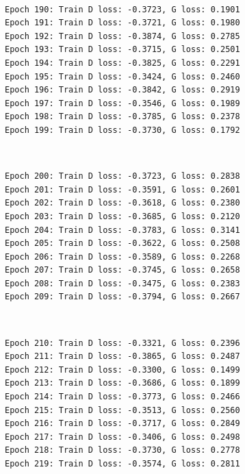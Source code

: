 \documentclass[11pt]{article}
\begin{document}
    \begin{center}
    \end{center}
    { \hspace*{\fill} \\}
    
    \begin{Verbatim}[commandchars=\\\{\}]
Epoch 190: Train D loss: -0.3723, G loss: 0.1901
Epoch 191: Train D loss: -0.3721, G loss: 0.1980
Epoch 192: Train D loss: -0.3874, G loss: 0.2785
Epoch 193: Train D loss: -0.3715, G loss: 0.2501
Epoch 194: Train D loss: -0.3825, G loss: 0.2291
Epoch 195: Train D loss: -0.3424, G loss: 0.2460
Epoch 196: Train D loss: -0.3842, G loss: 0.2919
Epoch 197: Train D loss: -0.3546, G loss: 0.1989
Epoch 198: Train D loss: -0.3785, G loss: 0.2378
Epoch 199: Train D loss: -0.3730, G loss: 0.1792

    \end{Verbatim}

    \begin{center}
    \end{center}
    { \hspace*{\fill} \\}
    
    \begin{Verbatim}[commandchars=\\\{\}]
Epoch 200: Train D loss: -0.3723, G loss: 0.2838
Epoch 201: Train D loss: -0.3591, G loss: 0.2601
Epoch 202: Train D loss: -0.3618, G loss: 0.2380
Epoch 203: Train D loss: -0.3685, G loss: 0.2120
Epoch 204: Train D loss: -0.3783, G loss: 0.3141
Epoch 205: Train D loss: -0.3622, G loss: 0.2508
Epoch 206: Train D loss: -0.3589, G loss: 0.2268
Epoch 207: Train D loss: -0.3745, G loss: 0.2658
Epoch 208: Train D loss: -0.3475, G loss: 0.2383
Epoch 209: Train D loss: -0.3794, G loss: 0.2667

    \end{Verbatim}

    \begin{center}
    \end{center}
    { \hspace*{\fill} \\}
    
    \begin{Verbatim}[commandchars=\\\{\}]
Epoch 210: Train D loss: -0.3321, G loss: 0.2396
Epoch 211: Train D loss: -0.3865, G loss: 0.2487
Epoch 212: Train D loss: -0.3300, G loss: 0.1499
Epoch 213: Train D loss: -0.3686, G loss: 0.1899
Epoch 214: Train D loss: -0.3773, G loss: 0.2466
Epoch 215: Train D loss: -0.3513, G loss: 0.2560
Epoch 216: Train D loss: -0.3717, G loss: 0.2849
Epoch 217: Train D loss: -0.3406, G loss: 0.2498
Epoch 218: Train D loss: -0.3730, G loss: 0.2778
Epoch 219: Train D loss: -0.3574, G loss: 0.2811

    \end{Verbatim}
\end{document}
